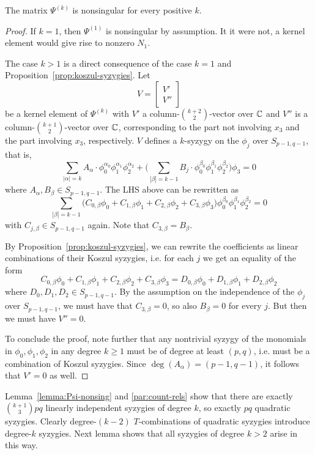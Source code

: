 \documentclass[fleqn,reqno]{amsart}
\begin{document}
\begin{lemma}
\label{lemma:Psi-nonsing}
The matrix $\Psi^{(k)}$ is nonsingular for every positive $k$.
\end{lemma}

\begin{proof}
If $k=1$, then $\Psi^{(1)}$ is nonsingular by assumption.
It it were not, a kernel element would give rise to nonzero $N_1$.

The case $k>1$ is a direct consequence of the case $k=1$
and Proposition~\ref{prop:koszul-syzygies}.
Let
\[
	V=\begin{bmatrix}{V'}\\{V''}\end{bmatrix}
\]
be a kernel element of $\Psi^{(k)}$ with $V'$ a column-$\binom{k+2}{2}$-vector over $\mathbb{C}$
and $V''$ is a column-$\binom{k+1}{2}$-vector over $\mathbb{C}$, corresponding to the part
not involving $x_3$ and the part involving $x_3$, respectively.
$V$ defines a $k$-syzygy on the $\phi_j$ over $S_{p-1,q-1}$, that is,
\[
	\sum_{|\alpha|=k} A_\alpha\cdot
	\phi_0^{\alpha_0}\phi_1^{\alpha_1}\phi_2^{\alpha_2}+
	\big(\sum_{|\beta|=k-1} B_{j}\cdot
	\phi_0^{\beta_0}\phi_1^{\beta_1}\phi_2^{\beta_2}\big)\phi_3=0
\]
where $A_\alpha, B_\beta\in S_{p-1,q-1}$.
The LHS above can be rewritten as
\[
	\sum_{|\beta|=k-1}\big(
	C_{0,\beta}\phi_0+C_{1,\beta}\phi_1+C_{2,\beta}\phi_2+C_{3,\beta}\phi_3\big)
	\phi_0^{\beta_0}\phi_1^{\beta_1}\phi_2^{\beta_2}=0
\]
with $C_{j,\beta}\in S_{p-1,q-1}$ again.
Note that $C_{3,\beta}=B_\beta$.

By Proposition~\ref{prop:koszul-syzygies},
we can rewrite the coefficients as linear combinations of their Koszul syzygies,
i.e. for each $j$ we get an equality of the form
\[
	C_{0,\beta}\phi_0+C_{1,\beta}\phi_1+C_{2,\beta}\phi_2+C_{3,\beta}\phi_3=
	D_{0,\beta}\phi_0+D_{1,\beta}\phi_1+D_{2,\beta}\phi_2
\]
where $D_0,D_1,D_2\in S_{p-1,q-1}$.
By the assumption on the independence of the $\phi_j$ over $S_{p-1,q-1}$,
we must have that $C_{3,\beta}=0$, so also $B_\beta=0$ for every $j$.
But then we must have $V''=0$.

To conclude the proof, note further that any nontrivial syzygy
of the monomials in $\phi_0,\phi_1,\phi_2$
in any degree $k\geq1$ must be of degree at least $(p,q)$,
i.e. must be a combination of Koszul syzygies.
Since $\deg(A_\alpha)=(p-1,q-1)$, it follows that $V'=0$ as well.
\end{proof}

\begin{paragraph}
Lemma~\ref{lemma:Psi-nonsing} and \eqref{par:count-rels} show that there are exactly
$\binom{k+1}{3}pq$ linearly independent syzygies of degree $k$,
so exactly $pq$ quadratic syzygies.
Clearly degree-$(k-2)$ $T$-combinations of quadratic syzygies introduce degree-$k$ syzygies.
Next lemma shows that all syzygies of degree $k>2$ arise in this way.
\end{paragraph}
\end{document}
